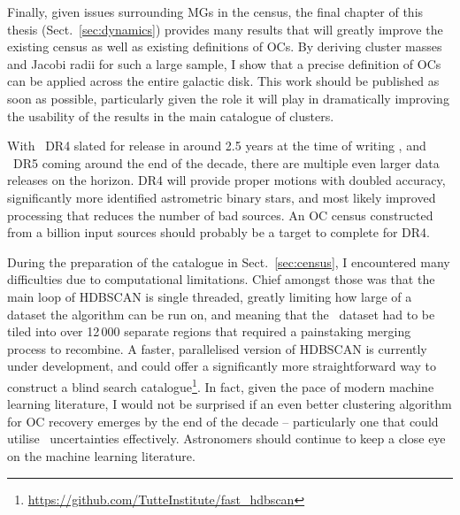 Finally, given issues surrounding MGs in the census, the final chapter of this thesis (Sect.~\ref{sec:dynamics}) provides many results that will greatly improve the existing census as well as existing definitions of OCs. By deriving cluster masses and Jacobi radii for such a large sample, I show that a precise definition of OCs can be applied across the entire galactic disk. This work should be published as soon as possible, particularly given the role it will play in dramatically improving the usability of the results in the main catalogue of clusters.

With \gaia\ DR4 slated for release in around 2.5 years at the time of writing \citep[no sooner than the end of 2025,][]{gaia_collaboration_gaia_2022}, and \gaia\ DR5 coming around the end of the decade, there are multiple even larger data releases on the horizon. DR4 will provide proper motions with doubled accuracy, significantly more identified astrometric binary stars, and most likely improved processing that reduces the number of bad sources. An OC census constructed from a billion input sources should probably be a target to complete for DR4.

During the preparation of the catalogue in Sect.~\ref{sec:census}, I encountered many difficulties due to computational limitations. Chief amongst those was that the main loop of HDBSCAN is single threaded, greatly limiting how large of a dataset the algorithm can be run on, and meaning that the \gaia\ dataset had to be tiled into over 12\,000 separate regions that required a painstaking merging process to recombine. A faster, parallelised version of HDBSCAN is currently under development, and could offer a significantly more straightforward way to construct a blind search catalogue\footnote{\url{https://github.com/TutteInstitute/fast_hdbscan}}. In fact, given the pace of modern machine learning literature, I would not be surprised if an even better clustering algorithm for OC recovery emerges by the end of the decade -- particularly one that could utilise \gaia\ uncertainties effectively. Astronomers should continue to keep a close eye on the machine learning literature.

